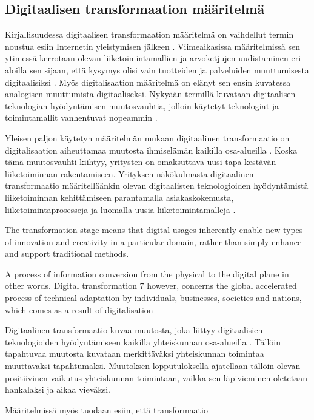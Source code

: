 \documentclass[finnish,12pt,a4paper,pdftex]{article}
\begin{document}
\subsection{Digitaalisen transformaation määritelmä}

Kirjallisuudessa digitaalisen transformaation määritelmä on vaihdellut termin noustua esiin Internetin yleistymisen jälkeen \citep{knobel}. Viimeaikasissa määritelmissä sen ytimessä kerrotaan olevan liiketoimintamallien ja arvoketjujen uudistaminen eri aloilla sen sijaan, että kysymys olisi vain tuotteiden ja palveluiden muuttumisesta digitaalisiksi \citep{lamoureux}. Myös digitalisaation määritelmä on elänyt sen ensin kuvatessa analogisen muuttumista digitaaliseksi. Nykyään termillä kuvataan digitaalisen teknologian hyödyntämisen muutosvauhtia, jolloin käytetyt teknologiat ja toimintamallit vanhentuvat nopeammin \citep{lamoureux}. 

Yleisen paljon käytetyn määritelmän mukaan digitaalinen transformaatio on digitalisaation aiheuttamaa muutosta ihmiselämän kaikilla osa-alueilla \citep{leanit}. Koska tämä muutosvauhti kiihtyy, yritysten on omaksuttava uusi tapa kestävän liiketoiminnan rakentamiseen. Yrityksen näkökulmasta digitaalinen transformaatio määritelläänkin olevan digitaalisten teknologioiden hyödyntämistä liiketoiminnan kehittämiseen parantamalla asiakaskokemusta, liiketoimintaprosesseja ja luomalla uusia liiketoimintamalleja \citep{lamoureux}. 


The transformation stage means that digital usages inherently enable new types of innovation and creativity in a particular domain, rather than simply enhance and support traditional methods.



 A process of
information conversion from the physical to the digital plane in other words. Digital transformation 
7
however, concerns the global accelerated process of technical adaptation by individuals, businesses,
societies and nations, which comes as a result of digitalisation 


Digitaalinen transformaatio kuvaa muutosta, joka liittyy digitaalisien teknologioiden hyödyntämiseen kaikilla yhteiskunnan osa-alueilla \citep{ETSILÄHDE}. Tällöin tapahtuvaa muutosta kuvataan merkittäväksi yhteiskunnan toimintaa muuttavaksi tapahtumaksi. Muutoksen lopputuloksella ajatellaan tällöin olevan positiivinen vaikutus yhteiskunnan toimintaan, vaikka sen läpivieminen oletetaan hankalaksi ja aikaa vieväksi.

Määritelmissä myös tuodaan esiin, että transformaatio 
\end{document}
